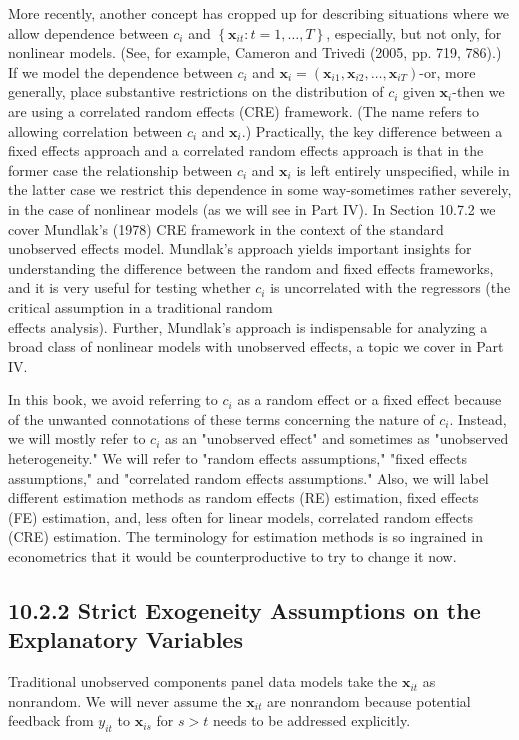 \documentclass[10pt]{article}
\begin{document}
More recently, another concept has cropped up for describing situations where we allow dependence between $c_{i}$ and $\left\{\mathbf{x}_{i t}: t=1, \ldots, T\right\}$, especially, but not only, for nonlinear models. (See, for example, Cameron and Trivedi (2005, pp. 719, 786).) If we model the dependence between $c_{i}$ and $\mathbf{x}_{i}=\left(\mathbf{x}_{i 1}, \mathbf{x}_{i 2}, \ldots, \mathbf{x}_{i T}\right)$-or, more generally, place substantive restrictions on the distribution of $c_{i}$ given $\mathbf{x}_{i}$-then we are using a correlated random effects (CRE) framework. (The name refers to allowing correlation between $c_{i}$ and $\mathbf{x}_{i}$.) Practically, the key difference between a fixed effects approach and a correlated random effects approach is that in the former case the relationship between $c_{i}$ and $\mathbf{x}_{i}$ is left entirely unspecified, while in the latter case we restrict this dependence in some way-sometimes rather severely, in the case of nonlinear models (as we will see in Part IV). In Section 10.7.2 we cover Mundlak's (1978) CRE framework in the context of the standard unobserved effects model. Mundlak's approach yields important insights for understanding the difference between the random and fixed effects frameworks, and it is very useful for testing whether $c_{i}$ is uncorrelated with the regressors (the critical assumption in a traditional random\\
effects analysis). Further, Mundlak's approach is indispensable for analyzing a broad class of nonlinear models with unobserved effects, a topic we cover in Part IV.

In this book, we avoid referring to $c_{i}$ as a random effect or a fixed effect because of the unwanted connotations of these terms concerning the nature of $c_{i}$. Instead, we will mostly refer to $c_{i}$ as an "unobserved effect" and sometimes as "unobserved heterogeneity." We will refer to "random effects assumptions," "fixed effects assumptions," and "correlated random effects assumptions." Also, we will label different estimation methods as random effects (RE) estimation, fixed effects (FE) estimation, and, less often for linear models, correlated random effects (CRE) estimation. The terminology for estimation methods is so ingrained in econometrics that it would be counterproductive to try to change it now.

\subsection*{10.2.2 Strict Exogeneity Assumptions on the Explanatory Variables}
Traditional unobserved components panel data models take the $\mathbf{x}_{i t}$ as nonrandom. We will never assume the $\mathbf{x}_{i t}$ are nonrandom because potential feedback from $y_{i t}$ to $\mathbf{x}_{i s}$ for $s>t$ needs to be addressed explicitly.
\end{document}
